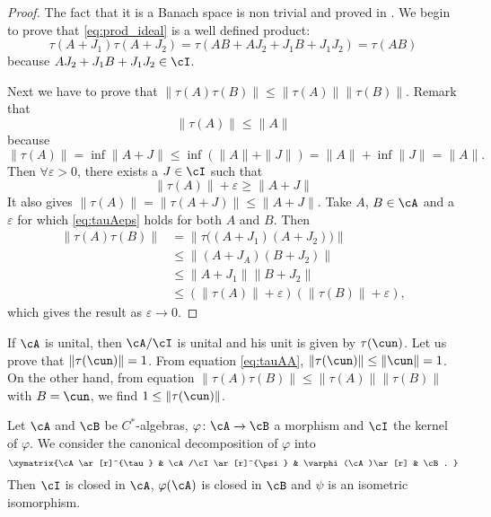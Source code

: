 \begin{proof}
The fact that it is a Banach space is non trivial and proved in \cite{thomaslassen}. We begin to prove that \eqref{eq:prod_ideal} is a well defined product:
\begin{equation}
   \tau(A+J_1)\tau(A+J_2)=\tau(AB+AJ_2+J_1B+J_1J_2)
                         =\tau(AB)
\end{equation}
because $AJ_2+J_1B+J_1J_2\in\cI$.

Next we have to prove that $\|\tau(A)\tau(B)\|\leq\|\tau(A)\|\|\tau(B)\|$. Remark that
\begin{equation} \label{eq:tauAA}
\|\tau(A)\|\leq\|A\|
\end{equation}
because 
\[
  \|\tau(A)\|=\inf\|A+J\|
             \leq\inf(\|A\|+\|J\|)
             =\|A\|+\inf\|J\|
             =\|A\|.
\]
Then $\forall\varepsilon>0$, there exists a $J\in\cI$ such that 
\begin{equation} \label{eq:tauAeps}
\|\tau(A)\|+\varepsilon\geq\|A+J\|
\end{equation}
It also gives $\|\tau(A)\|=\|\tau(A+J)\|\leq\|A+J\|$. Take $A$, $B\in\cA$ and a $\varepsilon$ for which \eqref{eq:tauAeps} holds for both $A$ and $B$. Then
\begin{equation}
\begin{split}
\|\tau(A)\tau(B)\|&=\|\tau\big( (A+J_1)(A+J_2)\big)\|\\
                  &\leq\|(A+J_A)(B+J_2)\|\\
                  &\leq\|A+J_1\|\|B+J_2\|\\
                  &\leq(\|\tau(A)\|+\varepsilon)(\|\tau(B)\|+\varepsilon),
\end{split}
\end{equation}
which gives the result as $\varepsilon\to 0$.

\end{proof}

If $\cA$ is unital, then $\cA/\cI$ is unital and his unit is given by $\tau(\cun)$. Let us prove that $\|\tau(\cun)\|=1$. From equation \eqref{eq:tauAA}, $\|\tau(\cun)\|\leq\|\cun\|=1$. On the other hand, from equation $\|\tau(A)\tau(B)\|\leq\|\tau(A)\|\|\tau(B)\|$ with $B=\cun$, we find $1\leq\|\tau(\cun)\|$. 

\begin{corollary}
    Let $\cA$ and $\cB$ be $C^*$-algebras, $\varphi\colon \cA\to \cB$ a morphism and $\cI$ the kernel of $\varphi$. We consider the canonical decomposition of $\varphi$ into
    \begin{equation}
    \xymatrix{%
       \cA \ar[r]^{\tau}    & \cA/\cI\ar[r]^{\psi}  & \varphi(\cA)\ar[r]    & \cB.
    }
    \end{equation}
    Then $\cI$ is closed in $\cA$, $\varphi(\cA)$ is closed in $\cB$ and $\psi$ is an isometric isomorphism.
\end{corollary}

